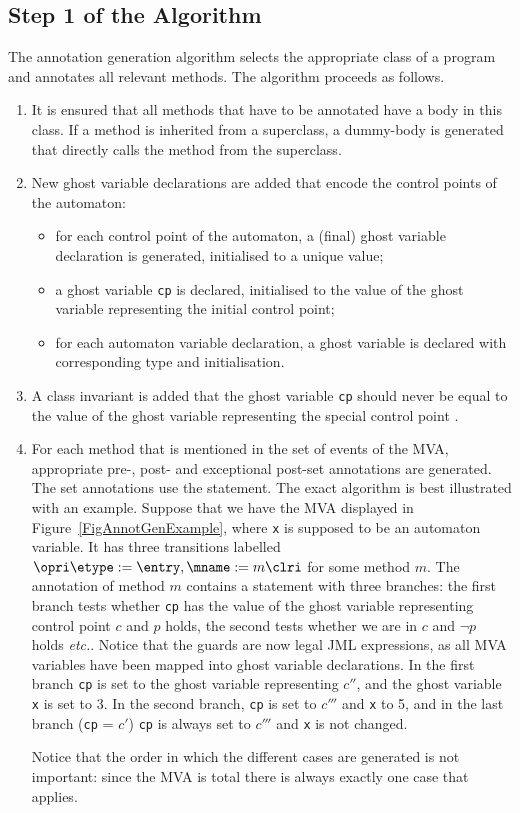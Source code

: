 \subsection{Step 1 of the Algorithm}
The annotation generation algorithm selects the appropriate class of a
program and annotates all relevant methods. The algorithm proceeds as
follows.
\begin{enumerate}
\item It is ensured that all methods that have to be annotated have a
body in this class. If a method is inherited from a superclass, a
dummy-body is generated that directly calls the method from the
superclass.
\item New ghost variable declarations are added that encode the
control points of the automaton:
\begin{itemize}
\item for each control point of the automaton, a (final) ghost
variable declaration is generated, initialised to a unique value;
\item a ghost variable \texttt{cp} is declared, initialised to the
value of the ghost variable representing the initial control point;
\item for each automaton variable declaration, a ghost variable is
declared with corresponding type and initialisation.
\end{itemize}
\item A class invariant is added that the ghost variable \texttt{cp}
should never be equal to the value of the ghost variable representing
the special control point \halted.
\item For each method that is mentioned in the set of events of the
MVA, appropriate pre-, post- and exceptional post-set annotations are
generated. The set annotations use the \CaseJML statement. The exact
algorithm is best illustrated with an example. Suppose that we have
the MVA displayed in Figure~\ref{FigAnnotGenExample}, where \texttt{x}
is supposed to be an automaton variable. It has 
three transitions labelled \(\opri \etype := \entry,
\mname := m\clri\) for some method \(m\). The \preset annotation
of method \(m\) contains a \CaseJML statement with three branches: the
first branch tests whether \texttt{cp} has the value of the ghost
variable representing control point \(c\) and \(p\) holds, the second
tests whether we are in \(c\) and \(\neg p\) holds \emph{etc.}. Notice
that the guards are now legal JML expressions, as all MVA variables
have been mapped into ghost variable declarations. In the first branch
\texttt{cp} is set to the ghost variable representing
\(c''\), and the ghost variable \texttt{x} is set to 3. In the second
branch,  \texttt{cp} is set to \(c'''\) and \texttt{x} to 5, and in
the last branch (\texttt{cp} = \(c'\)) \texttt{cp} is always set to
\(c'''\) and \texttt{x} is not changed.

Notice that the order in which the different cases are generated is
not important: since the MVA is total there is always exactly one case
that applies.
\end{enumerate}


